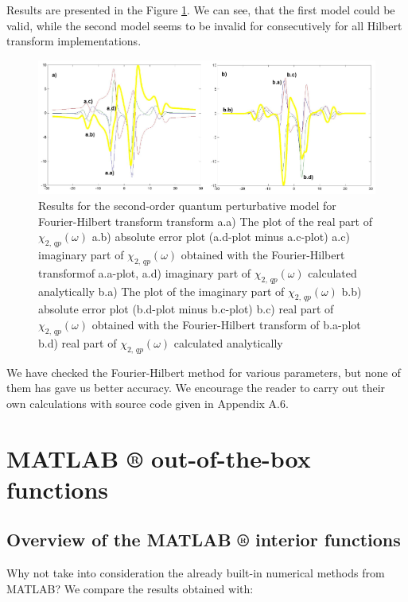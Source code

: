 \documentclass[12pt,twoside,a4paper]{article}
\numberwithin{equation}{subsection}
\numberwithin{figure}{subsection}
\begin{document}
Results are presented in the Figure \ref{fig:four_qp2}. We can see, that the first model could be valid, while the second model seems to be
invalid for consecutively for all Hilbert transform implementations.

\begin{figure} 
  \includegraphics[width=150mm]{img/four_qp2.png}
  \caption{Results for the second-order quantum perturbative model for Fourier-Hilbert transform transform
     a.a) The plot of the real part of ${\chi_{2, \,qp}}(\omega )$
     a.b) absolute error plot (a.d-plot minus a.c-plot)
     a.c) imaginary part of $\chi_{2, \, qp} (\omega )$ obtained with the Fourier-Hilbert transformof a.a-plot, 
     a.d) imaginary part of $\chi_{2, \, qp} (\omega )$ calculated analytically 
     b.a) The plot of the imaginary part of ${\chi_{2, \, qp}}(\omega )$ 
     b.b) absolute error plot (b.d-plot minus b.c-plot)
     b.c) real part of $\chi_{2, \, qp} (\omega )$ obtained with the Fourier-Hilbert transform of b.a-plot 
     b.d) real part of $\chi_{2, \, qp} (\omega )$ calculated analytically 
     \label{fig:four_qp2}
     }
\end{figure} 

We have checked the Fourier-Hilbert method for various parameters, but none of them has gave us better accuracy. We
encourage the reader to carry out their own calculations with source code given in Appendix A.6.

\section{MATLAB ® out-of-the-box functions} \label{chap:matlab}

\subsection{Overview of the MATLAB ® interior functions} \label{chap:matlab_overview}

Why not take into consideration the already built-in numerical methods from MATLAB? We compare the results obtained with: 
\end{document}
